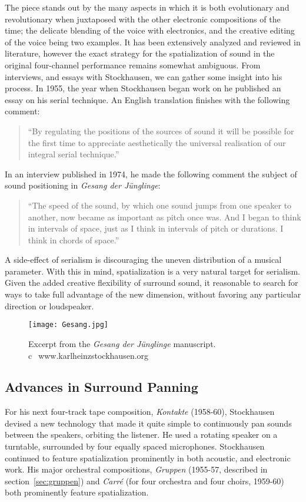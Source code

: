 The piece stands out by the many aspects in which it is both
evolutionary and revolutionary when juxtaposed with the other
electronic compositions of the time; the delicate blending of the
voice with electronics, and the creative editing of the voice being
two examples. It has been extensively analyzed and reviewed in
literature,\cite{Decroupet1998,Metzer2004,Miller2009} however the
exact strategy for the spatialization of sound in the original
four-channel performance remains somewhat ambiguous. From interviews,
and essays with Stockhausen, we can gather some insight into his
process. In 1955, the year when Stockhausen began work
on he published an essay on his serial technique. An English
translation finishes with the following comment:
\begin{quotation}
``By regulating the positions of the sources of sound it will be
possible for the first time to appreciate aesthetically the universal
realisation of our integral serial technique.''\cite{Stockhausen1955}
\end{quotation}
In an interview published in 1974, he made the following comment the
subject of sound positioning in \textit{Gesang der J\"{u}nglinge}:
\begin{quotation}
  ``The speed of the sound, by which one sound jumps from one speaker to
  another, now became as important as pitch once was. And I began to
  think in intervals of space, just as I think in intervals of pitch
  or durations. I think in chords of space.''\cite{Stockhausen1974}
\end{quotation}
A side-effect of serialism is discouraging the uneven distribution of
a musical parameter. With this in mind, spatialization is a very
natural target for serialism. Given the added creative flexibility of
surround sound, it reasonable to search for ways to take full
advantage of the new dimension, without favoring any particular
direction or loudspeaker.

\begin{figure}
  \texttt{[image: Gesang.jpg]}
  \caption{Excerpt from the \textit{Gesang der J\"{u}nglinge}
    manuscript. \textcircled{c}~www.karlheinzstockhausen.org}
  \label{fig:schaeffer-score}
\end{figure}

\subsection{Advances in Surround Panning}
\label{sec:advanc-surr-pann}
For his next four-track tape composition, \textit{Kontakte}
(1958-60), Stockhausen devised a new technology that made it quite
simple to continuously pan sounds between the speakers, orbiting the
listener. He used a rotating speaker on a turntable, surrounded by
four equally spaced microphones. Stockhausen continued to feature
spatialization prominently in both acoustic, and electronic work.  His
major orchestral compositions, \textit{Gruppen} (1955-57, described in
section~\ref{sec:gruppen}) and \textit{Carr\'{e}} (for four orchestra
and four choirs, 1959-60) both prominently feature spatialization.

